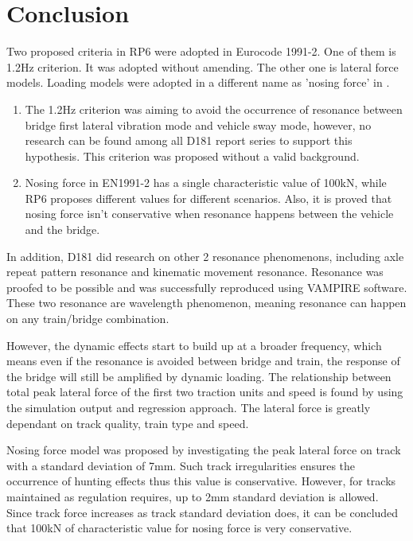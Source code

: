 

\chapter{Conclusion}


Two proposed criteria in RP6\citet{d181} were adopted in Eurocode 1991-2. One of them is 1.2Hz criterion. It was adopted without amending. The other one is lateral force models. Loading models were adopted in a different name as 'nosing force' in \citet[A6.5.2]{EC12}. 

\begin{enumerate}[-]
\item The 1.2Hz criterion was aiming to avoid the occurrence of resonance between bridge first lateral vibration mode and vehicle sway mode, however, no research can be found among all D181 report series to support this hypothesis. This criterion was proposed without a valid background.

\item Nosing force in EN1991-2 has a single characteristic value of 100kN, while RP6 proposes different values for different scenarios. Also, it is proved that nosing force isn't conservative when resonance happens between the vehicle and the bridge.
\end{enumerate}

In addition, D181 did research on other 2 resonance phenomenons, including axle repeat pattern resonance and kinematic movement resonance. Resonance was proofed to be possible and was successfully reproduced using VAMPIRE software. These two resonance are wavelength phenomenon, meaning resonance can happen on any train/bridge combination.

However, the dynamic effects start to build up at a broader frequency, which means even if the resonance is avoided between bridge and train, the response of the bridge will still be amplified by dynamic loading. The relationship between total peak lateral force of the first two traction units and speed is found by using the simulation output and regression approach. The lateral force is greatly dependant on track quality, train type and speed.

Nosing force model was proposed by investigating the peak lateral force on track with a standard deviation of 7mm. Such track irregularities ensures the occurrence of hunting effects thus this value is conservative. However, for tracks maintained as regulation requires, up to 2mm standard deviation is allowed. Since track force increases as track standard deviation does, it can be concluded that 100kN of characteristic value for nosing force is very conservative.

